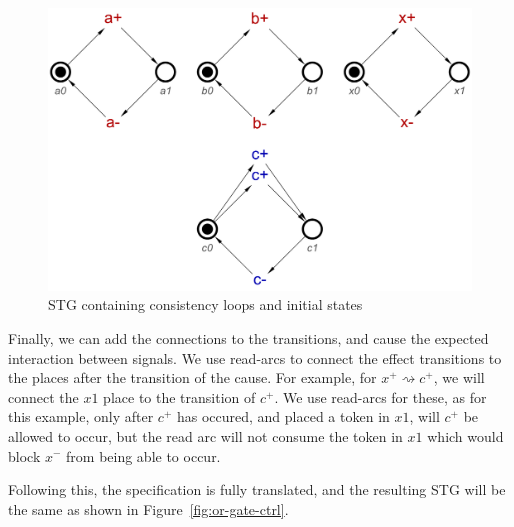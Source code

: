 \documentclass[british, journal]{IEEEtran}
\begin{document}
\vspace{-3mm}

\begin{figure}[h]
\begin{centering}
\includegraphics[scale=0.25]{Images/or-gate-ctrl-inits-stg}
\par\end{centering}
\vspace{-1mm}
\protect\caption{\label{fig:tokens} STG containing consistency loops and initial states}
\vspace{-3mm}
\end{figure}

Finally, we can add the connections to the transitions, and cause the 
expected interaction between signals. We use read-arcs to connect the effect
transitions to the places after the transition of the cause. For example, for
$x^{+} \rightsquigarrow c^{+}$, we will connect the $x1$ place to the 
transition of $c^{+}$. We use read-arcs for these, as for this example, only
after $c^{+}$ has occured, and placed a token in $x1$, will $c^{+}$ be allowed
to occur, but the read arc will not consume the token in $x1$ which would block
$x^{-}$ from being able to occur. 

Following this, the specification is fully translated, and the resulting STG will
be the same as shown in Figure~\ref{fig:or-gate-ctrl}.
\end{document}
